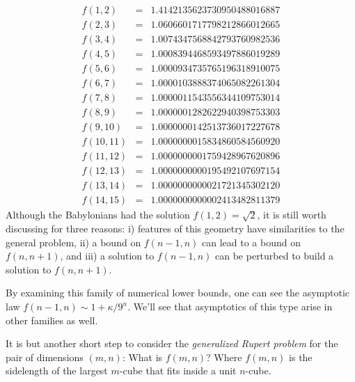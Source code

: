 \documentclass[superscriptaddress,reprint,amsmath,amssymb,aps]{revtex4-1}
\begin{document}
\vspace{-0.10in}
\begin{equation*}
  \begin{matrix}
    f( 1, 2) & = & 1.4142135623730950488016887 \\
    f( 2, 3) & = & 1.0606601717798212866012665 \\
    f( 3, 4) & = & 1.0074347568842793760982536 \\
    f( 4, 5) & = & 1.0008394468593497886019289 \\
    f( 5, 6) & = & 1.0000934735765196318910075 \\
    f( 6, 7) & = & 1.0000103888374065082261304 \\
    f( 7, 8) & = & 1.0000011543556344109753014 \\
    f( 8, 9) & = & 1.0000001282622940398753303 \\
    f( 9,10) & = & 1.0000000142513736017227678 \\
    f(10,11) & = & 1.0000000015834860584560920 \\
    f(11,12) & = & 1.0000000001759428967620896 \\
    f(12,13) & = & 1.0000000000195492107697154 \\
    f(13,14) & = & 1.0000000000021721345302120 \\
    f(14,15) & = & 1.0000000000002413482811379
  \end{matrix}
\end{equation*}
Although the Babylonians had the solution $f(1,2)=\sqrt{2}$\cite{neugebauer},
it is still worth discussing for three reasons: i) features of this geometry
have similarities to the general problem, ii) a bound on $f(n-1,n)$ can lead
to a bound on $f(n,n+1)$, and iii) a solution to $f(n-1,n)$ can be perturbed
to build a solution to $f(n,n+1)$.

By examining this family of numerical lower bounds, one can see the asymptotic
law 
$f(n-1,n) \sim 1+\kappa/9^{n}$.
We'll see that asymptotics of this type arise in other families as well.

It is but another short step to consider the {\it generalized Rupert problem}
for the pair of dimensions $(m,n)$: What is $f(m,n)$? Where $f(m,n)$ is the
sidelength of the largest $m$-cube that fits inside a unit $n$-cube.

\end{document}
